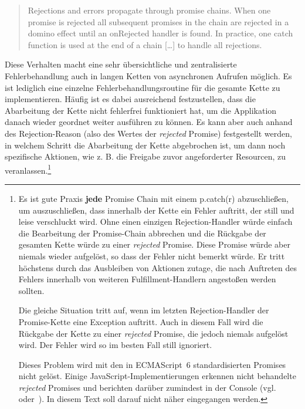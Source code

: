 \documentclass[
11pt, %
a4paper, %
oneside, %
pdfspacing, %
headinclude,
BCOR5mm, %
ngerman, %
bibtotocnumbered,
]{scrartcl}
\begin{document}
		\begin{quote}Rejections and errors propagate through promise chains. When one pro\-mise is rejected all subsequent promises in the chain are rejected in a domino effect until an onRejected handler is found. In practice, one catch function is used at the end of a chain [\ldots] to handle all rejections.~\citep[S.~20]{Parker.2015}\end{quote}
		
		Diese Verhalten macht eine sehr übersichtliche und zentralisierte Fehlerbehandlung auch in langen Ketten von asynchronen Aufrufen möglich. Es ist lediglich eine einzelne Fehlerbehandlungsroutine für die gesamte Kette zu implementieren. Häufig ist es dabei ausreichend festzustellen, dass die Abarbeitung der Kette nicht fehlerfrei funktioniert hat, um die Applikation danach wieder geordnet weiter ausführen zu können. Es kann aber auch anhand des Rejection-Reason (also des Wertes der \emph{rejected} Promise) festgestellt werden, in welchem Schritt die Abarbeitung der Kette abgebrochen ist, um dann noch spezifische Aktionen, wie z. B. die Freigabe zuvor angeforderter Resourcen, zu veranlassen.\footnote{
			Es ist gute Praxis \textbf{jede} Promise Chain mit einem \textsf{p.catch(r)} abzuschließen, um auszuschließen, dass innerhalb der Kette ein Fehler auftritt, der still und leise verschluckt wird. Ohne einen einzigen Rejection-Handler würde einfach die Bearbeitung der Promise-Chain abbrechen und die Rückgabe der gesamten Kette würde zu einer \emph{rejected} Promise. Diese Promise würde aber niemals wieder aufgelöst, so dass der Fehler nicht bemerkt würde. Er tritt höchstens durch das Ausbleiben von Aktionen zutage, die nach Auftreten des Fehlers innerhalb von weiteren Fulfillment-Handlern angestoßen werden sollten.
		
			Die gleiche Situation tritt auf, wenn im letzten Rejection-Handler der Promise-Kette eine Exception auftritt. Auch in diesem Fall wird die Rückgabe der Kette zu einer \emph{rejected} Promise, die jedoch niemals aufgelöst wird. Der Fehler wird so im besten Fall still ignoriert.
			
			Dieses Problem wird mit den in ECMAScript~6 standardisierten Promises nicht gelöst. Einige JavaScript-Implementierungen erkennen nicht behandelte \emph{rejected} Promises und berichten darüber zumindest in der Console (vgl.~\citep{Rauschmayer.2016} oder~\citep[S.~64]{Simpson.2015}). In diesem Text soll darauf nicht näher eingegangen werden.
		}
		
\end{document}
